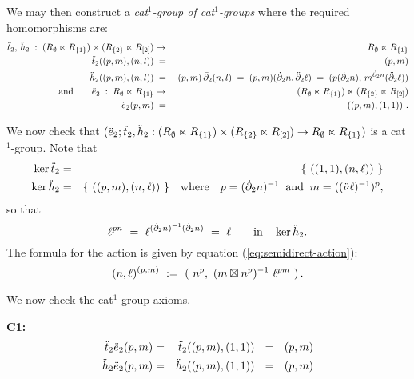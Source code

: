 \bigskip\noindent
We may then construct a \emph{cat$^1$-group of cat$^1$-groups}
where the required homomorphisms are:
\begin{eqnarray} 
\label{eq:cat2-th} 
\ddot{t}_2,\,\ddot{h}_2 \;:\; 
(R_{\emptyset} \ltimes R_{\{1\}}) \ltimes (R_{\{2\}} \ltimes R_{[2]})
  & \to & R_{\emptyset} \ltimes R_{\{1\}} \\
\nonumber
\ddot{t}_2((p,m),(n,l))
  & \;=\; & (p,m) \\
\nonumber
\ddot{h}_2((p,m),(n,l))
  & \;=\; & (p,m)\,\bar{\partial}_2(n,l) \;=\; (p,m)(\dot{\partial}_2 n,\ddot{\partial}_2\ell)
              \;=\;  (p(\dot{\partial}_2 n),\,m^{\dot{\partial}_2 n}(\ddot{\partial}_2\ell)) \\
\label{eq:cat2-e}
\mbox{and} \quad\quad \ddot{e}_2 \;:\; R_{\emptyset} \ltimes R_{\{1\}}
  & \to &  (R_{\emptyset} \ltimes R_{\{1\}}) 
            \ltimes (R_{\{2\}} \ltimes R_{[2]}) \\
\nonumber
\ddot{e}_2(p,m)
  & \;=\; & ((p,m),(1,1))~.
\end{eqnarray}

\bigskip
We now check that
$(\ddot{e}_2;\ddot{t}_2,\ddot{h}_2 :  
   (R_{\emptyset} \ltimes R_{\{1\}}) \ltimes (R_{\{2\}} 
   \ltimes R_{[2]}) \to R_{\emptyset} \ltimes R_{\{1\}} )$
is a cat$^1$-group.
Note that
\begin{eqnarray*}
\ker \ddot{t}_2  & = & 
\{~((1,1),(n,\ell))~\}   \\
\ker \ddot{h}_2  & = &
\{~((p,m),(n,\ell))~\}  \quad\mbox{where}\quad
p = (\dot{\partial}_2 n)^{-1}       \;\;\mbox{and}\;\;
m = ((\ddot{\nu} \ell)^{-1})^{p},
\end{eqnarray*}
so that
$$
\ell^{pn} ~=~ \ell^{(\dot{\partial}_2 n)^{-1}(\dot{\partial}_2 n)} ~=~ \ell
\qquad\mbox{in}\quad \ker \ddot{h}_2.
$$
The formula for the action is given by equation (\ref{eq:semidirect-action}): 
$$
(n,\ell)^{(p,m)} ~:=~ (~n^p,\ (m \bt n^p)^{-1}\ \ell^{pm}~)\,.
$$

\medskip\noindent
We now check the cat$^1$-group axioms.

\medskip\noindent
\textbf{C1:}
\vspace{-8mm}
\begin{eqnarray*}
\ddot{t}_2 \ddot{e}_2(p,m)
   & = & \ddot{t}_2((p,m),(1,1)) ~~ = ~~ (p,m) \\
\ddot{h}_2 \ddot{e}_2(p,m) 
   & = & \ddot{h}_2((p,m),(1,1)) ~~ = ~~ (p,m) \\
\end{eqnarray*}

